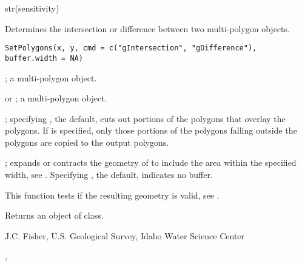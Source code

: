\documentclass[letterpaper]{book}
\begin{document}
%
\begin{Examples}
\begin{ExampleCode}
str(sensitivity)
\end{ExampleCode}
\end{Examples}
%
\begin{Description}\relax
Determines the intersection or difference between two multi-polygon objects.
\end{Description}
%
\begin{Usage}
\begin{verbatim}
SetPolygons(x, y, cmd = c("gIntersection", "gDifference"), buffer.width = NA)
\end{verbatim}
\end{Usage}
%
\begin{Arguments}
\begin{ldescription}
\item[\code{x}] ; a multi-polygon object.
\item[\code{y}]  or ; a multi-polygon object.
\item[\code{cmd}] ; specifying , the default, cuts out portions of the  polygons that overlay the  polygons.
If  is specified, only those portions of the  polygons falling outside the  polygons are copied to the output polygons.
\item[\code{buffer.width}] ; expands or contracts the geometry of  to include the area within the specified width, see .
Specifying , the default, indicates no buffer.
\end{ldescription}
\end{Arguments}
%
\begin{Details}\relax
This function tests if the resulting geometry is valid, see .
\end{Details}
%
\begin{Value}
Returns an object of  class.
\end{Value}
%
\begin{Author}\relax
J.C. Fisher, U.S. Geological Survey, Idaho Water Science Center
\end{Author}
%
\begin{SeeAlso}\relax
{}, 
\end{SeeAlso}
\end{document}
